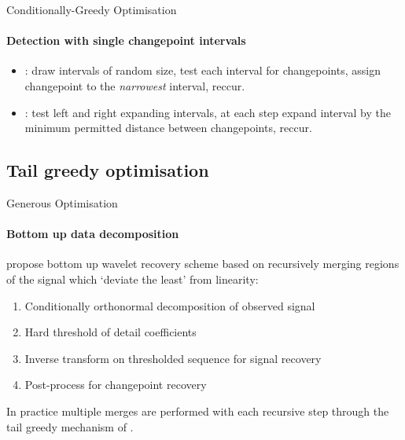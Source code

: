 \documentclass{beamer}
\begin{document}
\begin{frame}{Conditionally-Greedy Optimisation}
\framesubtitle{Detection with single changepoint intervals}

\begin{itemize}
    \item \cite{baranowski2019narrowest}: draw intervals of random size, test each interval for changepoints, assign changepoint to the \textit{narrowest} interval, reccur. 
    \bigskip
    \item \cite{anastasiou2019detecting}: test left and right expanding intervals, at each step expand interval by the minimum permitted distance between changepoints, reccur.
\end{itemize}
    
\end{frame}



\subsection{Tail greedy optimisation}




\begin{frame}{Generous Optimisation}
\framesubtitle{Bottom up data decomposition}

\cite{maeng2019detecting} propose bottom up wavelet recovery scheme based on recursively merging regions of the signal which `deviate the least' from linearity: 

\bigskip

\begin{enumerate}
    \item Conditionally orthonormal decomposition of observed signal
    \item Hard threshold of detail coefficients 
    \item Inverse transform on thresholded sequence for signal recovery 
    \item Post-process for changepoint recovery
\end{enumerate}

\bigskip

In practice multiple merges are performed with each recursive step through the tail greedy mechanism of \cite{fryzlewicz2018tail}.
\end{frame}



\end{document}
